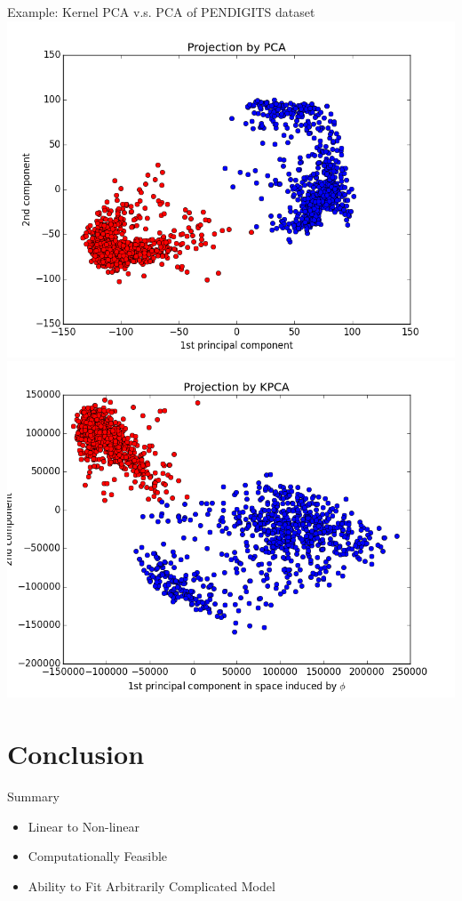 \documentclass[10pt, compress]{beamer}
\begin{document}
\begin{frame}[fragile]{Example: Kernel PCA v.s. PCA of PENDIGITS dataset}
  \includegraphics[width=\textwidth, height=.4\textheight]{images/pca_pen.png} \\
  \includegraphics[width=\textwidth, height=.4\textheight]{images/kpca_pen.png}
\end{frame}

\section{Conclusion}

\begin{frame}{Summary}

  \begin{itemize}
    \item Linear to Non-linear
    \item Computationally Feasible
    \item Ability to Fit Arbitrarily Complicated Model
  \end{itemize}

\end{frame}

\end{document}
